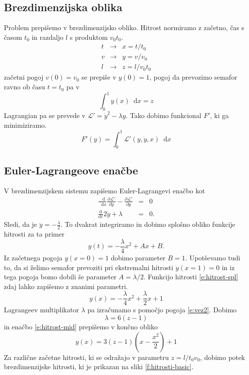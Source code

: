 \documentclass[a4paper, 12pt, slovene]{article}
\newcommand*\diff{\mathop{}\!\mathrm{d}}
\numberwithin{equation}{section}
\newcommand{\ddd}{\mathrm{d}}
\newcommand{\lag}{\mathcal{L}\!}
\newcommand{\pd}{\partial}
\newcommand{\Dd}[3][{}]{\frac{\ddd^{#1} #2}{\ddd #3^{#1}}}
\newcommand{\Pd}[3][{}]{\frac{\pd^{#1} #2}{\pd #3^{#1}}}
\begin{document}
\subsection{Brezdimenzijska oblika}
Problem prepišemo v brezdimenzijsko obliko. Hitrost normiramo z začetno, čas s časom $t_0$ in razdaljo $l$ s produktom $v_0t_0$.
\begin{eqnarray}
t	&\rightarrow &	x = t/t_0	\\
v	&\rightarrow &	y = v/v_0	\\
l	&\rightarrow & z = l/v_0t_0
\end{eqnarray}
začetni pogoj $v(0) = v_0$ se prepiše v $y(0) = 1$, pogoj da prevozimo semafor ravno ob času $t = t_0$ pa v
\begin{equation}
\int_0^1y(x)\diff x = z
\label{e:vez2}
\end{equation}
Lagrangian pa se prevede v $\lag' = \dot{y}^2 - \lambda y$. Tako dobimo funkcional $F'$, ki ga minimiziramo.
\begin{equation}
F'(y) = \int_0^1\lag'(y, \dot{y}, x)\diff x
\end{equation}


\subsection{Euler-Lagrangeove enačbe}
V brezdimenzijskem sistemu zapišemo Euler-Lagrangevi enačbo kot
\begin{eqnarray}
\frac{\diff}{\diff x}\Pd{\lag'}{\dot{y}} - \Pd{\lag'}{y} &=& 0 \\
\Dd{}{t}2\dot{y} + \lambda &=& 0.
\end{eqnarray}
Sledi, da je $\ddot{y} = - \frac{\lambda}{2}$. To dvakrat integriramo in dobimo splošno obliko funkcije hitrosti za ta primer
\begin{equation}
y(t) = -\frac{\lambda}{4}x^2 + Ax + B.
\label{e:hitrost-spl}
\end{equation}
Iz začetnega pogoja $y(x=0) = 1$ dobimo parameter $B=1$. Upotševamo tudi to, da si želimo semafor prevoziti pri ekstremalni hitrosti $\dot{y}(x=1) = 0$ in iz tega pogoja bomo dobili še parameter $A=\lambda/2$. Funkcijo hitrosti \eqref{e:hitrost-spl} zdaj lahko zapišemo z znanimi parametri.
\begin{equation}
y(x) = -\frac{\lambda}{4}x^2 + \frac{\lambda}{2}x + 1
\label{e:hitrost-mid}
\end{equation}
Lagrangeev multiplikator $\lambda$ pa izračunamo s pomočjo pogoja \eqref{e:vez2}. Dobimo
\begin{equation}
\lambda = 6(z-1)
\end{equation}
in enačbo \eqref{e:hitrost-mid} prepišemo v končno obliko
\begin{equation}
y(x) = 3\left( z-1 \right)\left( x - \frac{x^2}{2}\right) + 1
\label{e:hitrost-fin}
\end{equation}
Za različne začetne hitrosti, ki se odražajo v parametru $z=l/t_0v_0$, dobimo potek brezdimenzijske hitrosti, ki je prikazan na sliki \ref{f:hitrosti-basic}.
\end{document}
